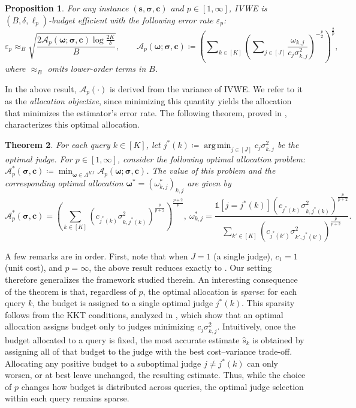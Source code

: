 \documentclass{article}
\def\vc{{\bm{c}}}
\def\vs{{\bm{s}}}
\def\gA{{\mathcal{A}}}
\DeclareMathOperator*{\argmin}{arg\,min}
\theoremstyle{plain}
\newtheorem{theorem}{Theorem}[section]
\newtheorem{proposition}[theorem]{Proposition}
\theoremstyle{definition}
\theoremstyle{plain}
\newcommand{\indicator}{\mathds{1}}
\newcommand{\ivwe}{\textsc{IVWE}}
\begin{document}
\begin{proposition}
    For any instance $(\vs, \bm\sigma, \vc)$ and $p\in[1,\infty]$, \ivwe{} is $(B, \delta, \ell_p)$-budget efficient with the following error rate $\varepsilon_p$:
    \begin{equation}
        \varepsilon_p \approx_B \sqrt{\frac{2 \gA_p(\bm\omega; \bm\sigma, \vc) \log\frac{2K}{\delta}}{B}}, \qquad
        \gA_p(\bm\omega; \bm\sigma, \vc) \coloneq \left( \sum\nolimits_{k \in [K]} \left( \sum\nolimits_{j \in [J]} \frac{\omega_{k,j}}{c_j \sigma_{k,j}^2} \right)^{-\frac{p}{2}} \right)^{\frac{2}{p}},
    \end{equation}
    where $\approx_B$ omits lower-order terms in $B$. 
\end{proposition}
In the above result, \(\gA_p(\cdot)\) is derived from the variance of \ivwe{}. We refer to it as the \emph{allocation objective}, since minimizing this quantity yields the allocation that minimizes the estimator's error rate. The following theorem, proved in , characterizes this optimal allocation.
\begin{theorem}
\label{thm:optimal-allocation}
    For each query $k \in [K]$, let $j^*(k) \coloneq \argmin_{j \in [J]} c_j \sigma_{k,j}^2$ be the optimal judge. For $p \in [1, \infty]$, consider the following optimal allocation problem: $\gA_p^*(\bm\sigma, \vc) \coloneq \min_{\bm\omega\in \Lambda^{KJ}} \gA_p(\bm\omega; \bm\sigma, \vc)$. 
    The value of this problem and the corresponding optimal allocation $\bm\omega^* = (\omega_{k,j}^*)_{k,j}$ are given by
    \begin{equation}
        \gA_p^*(\bm\sigma, \vc) = \left( \sum_{k \in [K]} \left( c_{j^*(k)} \sigma_{k,j^*(k)}^2 \right)^{\frac{p}{p+2}} \right)^{\frac{p + 2}{p}}, \
        \omega_{k,j}^* = \frac{{\indicator[j = j^*(k)]} \left( c_{j^*(k)} \sigma_{k,j^*(k)}^2 \right)^{\frac{p}{p+2}}}{\sum_{k' \in [K]} \left( c_{j^*(k')} \sigma_{k',j^*(k')}^2 \right)^{\frac{p}{p+2}}}.
    \end{equation}
\end{theorem}

A few remarks are in order. First, note that when \(J=1\) (a single judge), \(c_1=1\) (unit cost), and \(p=\infty\), the above result reduces exactly to \cite[Theorem~3]{saha2026budget}. Our setting therefore generalizes the framework studied therein. An interesting consequence of the theorem is that, regardless of \(p\), the optimal allocation is \emph{sparse}: for each query \(k\), the budget is assigned to a single optimal judge \(j^*(k)\). This sparsity follows from the KKT conditions, analyzed in , which show that an optimal allocation assigns budget only to judges minimizing \(c_j\sigma_{k,j}^2\). Intuitively, once the budget allocated to a query is fixed, the most accurate estimate \(\hat{s}_k\) is obtained by assigning all of that budget to the judge with the best cost--variance trade-off. Allocating any positive budget to a suboptimal judge \(j\neq j^*(k)\) can only worsen, or at best leave unchanged, the resulting estimate. Thus, while the choice of \(p\) changes how budget is distributed across queries, the optimal judge selection within each query remains sparse.
\end{document}
